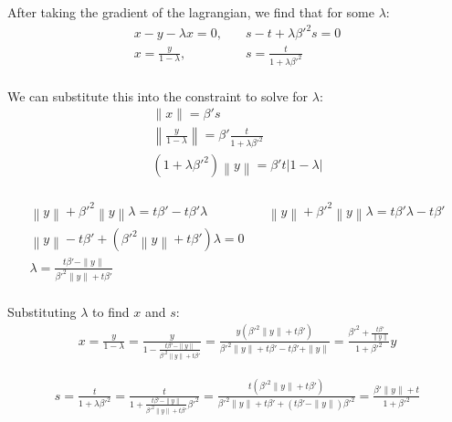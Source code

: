 \documentclass{article}
\theoremstyle{case}
\begin{document}
After taking the gradient of the lagrangian, we find that for some $\lambda$:
\begin{align*}
x - y - \lambda x = 0, & \quad s - t + \lambda {\beta'}^2 s = 0 \\
x = \frac {y}{1 - \lambda}, & \quad s = \frac {t}{1 + \lambda {\beta'}^2 } \\
\end{align*}

We can substitute this into the constraint to solve for $\lambda$:
\begin{align*}
\|x\| = {\beta'} s \\
\left\|\frac {y}{1 - \lambda}\right\| = {\beta'} \frac {t}{1 + \lambda {\beta'}^2 } \\
\left(1 + \lambda {\beta'}^2\right) \left\|y\right\| = {\beta'}  {t} \left|1 - \lambda\right|\\
\end{align*}

\begin{align*}
\left\|y\right\| + {\beta'}^2\left\|y\right\|\lambda = t {\beta'} - t {\beta'} \lambda          &   \quad
\left\|y\right\| + {\beta'}^2\left\|y\right\|\lambda = t {\beta'} \lambda - t {\beta'}					\\
\left\|y\right\|-t {\beta'} +\left( {\beta'}^2\left\|y\right\| + t {\beta'} \right)\lambda = 0  &		\\
\lambda = \frac{t {\beta'} - \|y\|}{{\beta'}^2\|y\| + t {\beta'}}                               &		\\
\end{align*}


Substituting $\lambda$ to find $x$ and $s$:
\begin{align*}
x = \frac {y}{1 - \lambda} 																		
= \frac {y}{1 - \frac{t{\beta'} - \|y\|}{{\beta'}^2\|y\| + t{\beta'}}} 									
= \frac {y\left({\beta'}^2\|y\| + t{\beta'}\right)}{{\beta'}^2\|y\| + t{\beta'} - t{\beta'} + \|y\|} 			
= \frac {{\beta'}^2 + \frac{t{\beta'}}{\|y\|}}{1 + {\beta'}^2}y 											
\end{align*}

\begin{align*}
s = \frac {t}{1 + \lambda{\beta'}^2 } 
= \frac {t}{1 +\frac{t{\beta'} - \|y\|}{{\beta'}^2\|y\| + t{\beta'}}{\beta'}^2 } 
= \frac {t\left({\beta'}^2\|y\| + t{\beta'}\right)}{{\beta'}^2\|y\| + t{\beta'} + \left(t{\beta'} - \|y\|\right){\beta'}^2 } 
= \frac {{\beta'}\|y\| + t}{1 + {\beta'}^2 } 
\end{align*}
\end{document}
